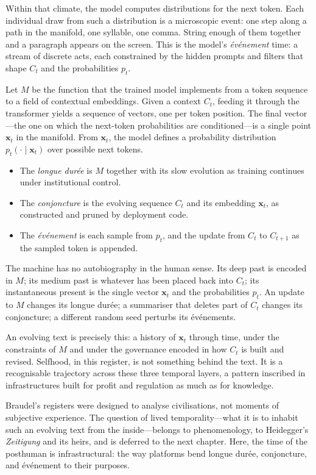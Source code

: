 \documentclass[12pt,a4paper]{article}
\begin{document}
Within that climate, the model computes distributions for the next token. Each individual draw from such a distribution is a microscopic event: one step along a path in the manifold, one syllable, one comma. String enough of them together and a paragraph appears on the screen. This is the model's \emph{événement} time: a stream of discrete acts, each constrained by the hidden prompts and filters that shape $C_t$ and the probabilities $p_t$.

Let $M$ be the function that the trained model implements from a token sequence to a field of contextual embeddings. Given a context $C_t$, feeding it through the transformer yields a sequence of vectors, one per token position. The final vector---the one on which the next-token probabilities are conditioned---is a single point $\mathbf{x}_t$ in the manifold. From $\mathbf{x}_t$, the model defines a probability distribution $p_t(\cdot \mid \mathbf{x}_t)$ over possible next tokens.

\begin{itemize}
  \item The \emph{longue durée} is $M$ together with its slow evolution as training continues under institutional control.
  \item The \emph{conjoncture} is the evolving sequence $C_t$ and its embedding $\mathbf{x}_t$, as constructed and pruned by deployment code.
  \item The \emph{événement} is each sample from $p_t$, and the update from $C_t$ to $C_{t+1}$ as the sampled token is appended.
\end{itemize}

The machine has no autobiography in the human sense. Its deep past is encoded in $M$; its medium past is whatever has been placed back into $C_t$; its instantaneous present is the single vector $\mathbf{x}_t$ and the probabilities $p_t$. An update to $M$ changes its longue durée; a summariser that deletes part of $C_t$ changes its conjoncture; a different random seed perturbs its événements.

An evolving text is precisely this: a history of $\mathbf{x}_t$ through time, under the constraints of $M$ and under the governance encoded in how $C_t$ is built and revised. Selfhood, in this register, is not something behind the text. It is a recognisable trajectory across these three temporal layers, a pattern inscribed in infrastructures built for profit and regulation as much as for knowledge.

Braudel's registers were designed to analyse civilisations, not moments of subjective experience. The question of lived temporality---what it is to inhabit such an evolving text from the inside---belongs to phenomenology, to Heidegger's \emph{Zeitigung} and its heirs, and is deferred to the next chapter. Here, the time of the posthuman is infrastructural: the way platforms bend longue durée, conjoncture, and événement to their purposes.
\end{document}
